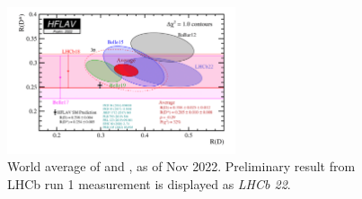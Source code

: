 \begin{figure}[htb]
    \centering
    \includegraphics[width=0.6\textwidth]{./figs-intro/hflav_2022_preliminary.png}
    \caption{
        World average of \RD and \RDst, as of Nov 2022.
        Preliminary result from LHCb run 1 measurement is displayed as
        \emph{LHCb 22}.
    }
    \label{fig:hflav}
\end{figure}
